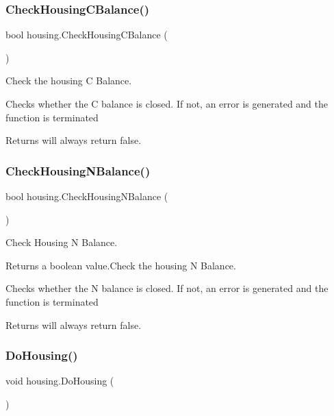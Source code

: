 \subsubsection{\texorpdfstring{CheckHousingCBalance()}{CheckHousingCBalance()}}
{\footnotesize\ttfamily bool housing.\+Check\+Housing\+C\+Balance (\begin{DoxyParamCaption}{ }\end{DoxyParamCaption})\hspace{0.3cm}{\ttfamily [inline]}}



Check the housing C Balance. 

Checks whether the C balance is closed. If not, an error is generated and the function is terminated \begin{DoxyReturn}{Returns}
will always return false. 
\end{DoxyReturn}
\mbox{\label{classhousing_af5df42adc33faded1ac9814881629c85}} 
\subsubsection{\texorpdfstring{CheckHousingNBalance()}{CheckHousingNBalance()}}
{\footnotesize\ttfamily bool housing.\+Check\+Housing\+N\+Balance (\begin{DoxyParamCaption}{ }\end{DoxyParamCaption})\hspace{0.3cm}{\ttfamily [inline]}}



Check Housing N Balance. 

\begin{DoxyReturn}{Returns}
a boolean value.\+Check the housing N Balance.
\end{DoxyReturn}
Checks whether the N balance is closed. If not, an error is generated and the function is terminated \begin{DoxyReturn}{Returns}
will always return false. 
\end{DoxyReturn}
\mbox{\label{classhousing_af7e45d8da4358309aaacb9d24bb19523}} 
\subsubsection{\texorpdfstring{DoHousing()}{DoHousing()}}
{\footnotesize\ttfamily void housing.\+Do\+Housing (\begin{DoxyParamCaption}{ }\end{DoxyParamCaption})\hspace{0.3cm}{\ttfamily [inline]}}



